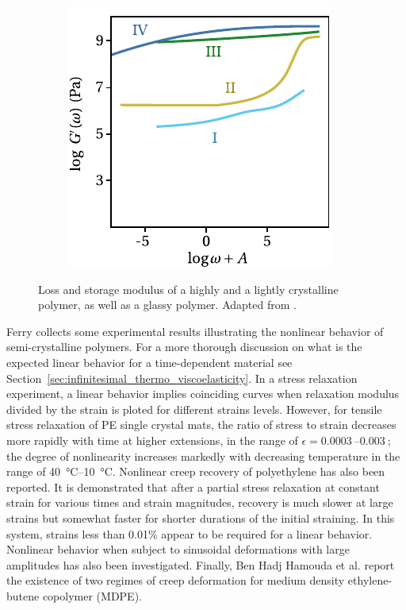 \begin{figure}
\begin{subfigure}[b]{0.45\textwidth}
						\includegraphics[width=\textwidth]{figures/storage_modulus_scp}
						\caption{}
						\label{subfig:storage_modulus_scp}
		\end{subfigure}
	\caption{Loss  and storage  modulus of a highly and a lightly crystalline polymer, as well as a glassy polymer. Adapted from \cite{ferryViscoelasticPropertiesPolymers1980}.}
\label{fig:dma_scp}
\end{figure}

Ferry \citep{ferryViscoelasticPropertiesPolymers1980} collects some experimental results illustrating the nonlinear behavior of semi-crystalline polymers.
For a more thorough discussion on what is the expected linear behavior for a time-dependent material see Section~\ref{sec:infinitesimal_thermo_viscoelasticity}.
In a stress relaxation experiment, a linear behavior implies coinciding curves when relaxation modulus divided by the strain is ploted for different strains levels.
However, for tensile stress relaxation of PE single crystal mats, the ratio of stress to strain decreases more rapidly with time at higher extensions, in the range of $\epsilon = \SIrange{0.0003}{0.003}{}$; the degree of nonlinearity increases markedly with decreasing temperature in the range of \SIrange{40}{10}{\celsius}.
Nonlinear creep recovery of polyethylene has also been reported.
It is demonstrated that after a partial stress relaxation at constant strain for various times and strain magnitudes, recovery is much slower at large strains but somewhat faster for shorter durations of the initial straining.
In this system, strains less than 0.01\% appear to be required for a linear behavior.
Nonlinear behavior when subject to sinusoidal deformations with large amplitudes has also been investigated.
Finally, Ben Hadj Hamouda et al. \citep{benhadjhamoudaViscoplasticBehaviourMedium2007} report the existence of two regimes of creep deformation for medium density ethylene-butene copolymer (MDPE).

